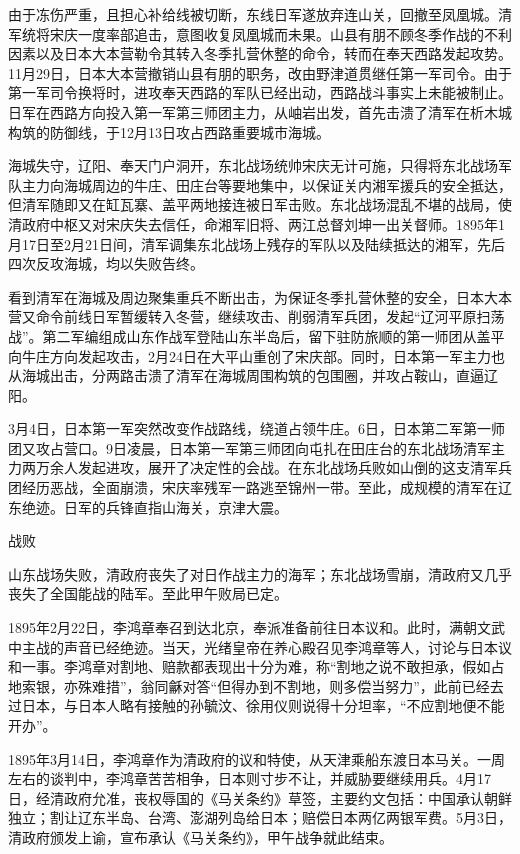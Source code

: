 \documentclass[12pt,UTF8]{ctexbook}
\begin{document}
由于冻伤严重，且担心补给线被切断，东线日军遂放弃连山关，回撤至凤凰城。清军统将宋庆一度率部追击，意图收复凤凰城而未果。山县有朋不顾冬季作战的不利因素以及日本大本营勒令其转入冬季扎营休整的命令，转而在奉天西路发起攻势。11月29日，日本大本营撤销山县有朋的职务，改由野津道贯继任第一军司令。由于第一军司令换将时，进攻奉天西路的军队已经出动，西路战斗事实上未能被制止。日军在西路方向投入第一军第三师团主力，从岫岩出发，首先击溃了清军在析木城构筑的防御线，于12月13日攻占西路重要城市海城。

海城失守，辽阳、奉天门户洞开，东北战场统帅宋庆无计可施，只得将东北战场军队主力向海城周边的牛庄、田庄台等要地集中，以保证关内湘军援兵的安全抵达，但清军随即又在缸瓦寨、盖平两地接连被日军击败。东北战场混乱不堪的战局，使清政府中枢又对宋庆失去信任，命湘军旧将、两江总督刘坤一出关督师。1895年1月17日至2月21日间，清军调集东北战场上残存的军队以及陆续抵达的湘军，先后四次反攻海城，均以失败告终。

看到清军在海城及周边聚集重兵不断出击，为保证冬季扎营休整的安全，日本大本营又命令前线日军暂缓转入冬营，继续攻击、削弱清军兵团，发起“辽河平原扫荡战”。第二军编组成山东作战军登陆山东半岛后，留下驻防旅顺的第一师团从盖平向牛庄方向发起攻击，2月24日在大平山重创了宋庆部。同时，日本第一军主力也从海城出击，分两路击溃了清军在海城周围构筑的包围圈，并攻占鞍山，直逼辽阳。

3月4日，日本第一军突然改变作战路线，绕道占领牛庄。6日，日本第二军第一师团又攻占营口。9日凌晨，日本第一军第三师团向屯扎在田庄台的东北战场清军主力两万余人发起进攻，展开了决定性的会战。在东北战场兵败如山倒的这支清军兵团经历恶战，全面崩溃，宋庆率残军一路逃至锦州一带。至此，成规模的清军在辽东绝迹。日军的兵锋直指山海关，京津大震。

战败

山东战场失败，清政府丧失了对日作战主力的海军；东北战场雪崩，清政府又几乎丧失了全国能战的陆军。至此甲午败局已定。

1895年2月22日，李鸿章奉召到达北京，奉派准备前往日本议和。此时，满朝文武中主战的声音已经绝迹。当天，光绪皇帝在养心殿召见李鸿章等人，讨论与日本议和一事。李鸿章对割地、赔款都表现出十分为难，称“割地之说不敢担承，假如占地索银，亦殊难措”，翁同龢对答“但得办到不割地，则多偿当努力”，此前已经去过日本，与日本人略有接触的孙毓汶、徐用仪则说得十分坦率，“不应割地便不能开办”。

1895年3月14日，李鸿章作为清政府的议和特使，从天津乘船东渡日本马关。一周左右的谈判中，李鸿章苦苦相争，日本则寸步不让，并威胁要继续用兵。4月17日，经清政府允准，丧权辱国的《马关条约》草签，主要约文包括：中国承认朝鲜独立；割让辽东半岛、台湾、澎湖列岛给日本；赔偿日本两亿两银军费。5月3日，清政府颁发上谕，宣布承认《马关条约》，甲午战争就此结束。
\end{document}
